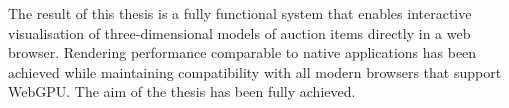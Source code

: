 The result of this thesis is a fully functional system that enables interactive visualisation of three-dimensional models of auction items directly in a web browser. Rendering performance comparable to native applications has been achieved while maintaining compatibility with all modern browsers that support WebGPU. The aim of the thesis has been fully achieved.